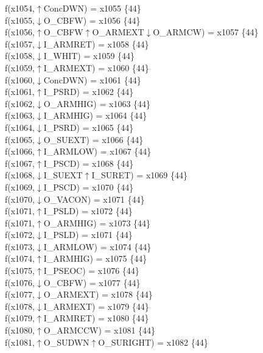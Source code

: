 f(x1054,$\uparrow$ConcDWN) = x1055 \{44\} \\  
f(x1055,$\downarrow$O\_CBFW) = x1056 \{44\} \\  
f(x1056,$\uparrow$O\_CBFW$\uparrow$O\_ARMEXT$\downarrow$O\_ARMCW) = x1057 \{44\} \\  
f(x1057,$\downarrow$I\_ARMRET) = x1058 \{44\} \\  
f(x1058,$\downarrow$I\_WHIT) = x1059 \{44\} \\  
f(x1059,$\uparrow$I\_ARMEXT) = x1060 \{44\} \\  
f(x1060,$\downarrow$ConcDWN) = x1061 \{44\} \\  
f(x1061,$\uparrow$I\_PSRD) = x1062 \{44\} \\  
f(x1062,$\downarrow$O\_ARMHIG) = x1063 \{44\} \\  
f(x1063,$\downarrow$I\_ARMHIG) = x1064 \{44\} \\  
f(x1064,$\downarrow$I\_PSRD) = x1065 \{44\} \\  
f(x1065,$\downarrow$O\_SUEXT) = x1066 \{44\} \\  
f(x1066,$\uparrow$I\_ARMLOW) = x1067 \{44\} \\  
f(x1067,$\uparrow$I\_PSCD) = x1068 \{44\} \\  
f(x1068,$\downarrow$I\_SUEXT$\uparrow$I\_SURET) = x1069 \{44\} \\  
f(x1069,$\downarrow$I\_PSCD) = x1070 \{44\} \\  
f(x1070,$\downarrow$O\_VACON) = x1071 \{44\} \\  
f(x1071,$\uparrow$I\_PSLD) = x1072 \{44\} \\  
f(x1071,$\uparrow$O\_ARMHIG) = x1073 \{44\} \\  
f(x1072,$\downarrow$I\_PSLD) = x1071 \{44\} \\  
f(x1073,$\downarrow$I\_ARMLOW) = x1074 \{44\} \\  
f(x1074,$\uparrow$I\_ARMHIG) = x1075 \{44\} \\  
f(x1075,$\uparrow$I\_PSEOC) = x1076 \{44\} \\  
f(x1076,$\downarrow$O\_CBFW) = x1077 \{44\} \\  
f(x1077,$\downarrow$O\_ARMEXT) = x1078 \{44\} \\  
f(x1078,$\downarrow$I\_ARMEXT) = x1079 \{44\} \\  
f(x1079,$\uparrow$I\_ARMRET) = x1080 \{44\} \\  
f(x1080,$\uparrow$O\_ARMCCW) = x1081 \{44\} \\  
f(x1081,$\uparrow$O\_SUDWN$\uparrow$O\_SURIGHT) = x1082 \{44\} \\  
